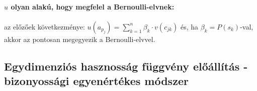 \documentclass[a4paper,12pt]{article}
\begin{document}
\paragraph{$u$ olyan alakú, hogy megfelel a Bernoulli-elvnek:} az előzőek következménye: $u(a_{p_j}) = \sum^n_{k=1} \beta_k \cdot  v(c_{jk})$ és, ha $\beta_k = P(s_k)$-val, akkor az pontosan megegyezik a Bernoulli-elvvel.  






\subsection{Egydimenziós hasznosság függvény előállítás - bizonyossági egyenértékes módszer}
\end{document}
